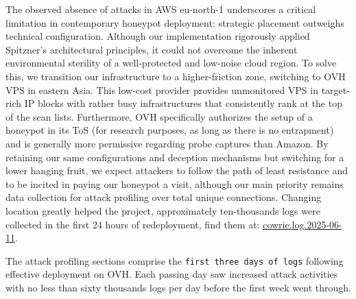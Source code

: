 \documentclass{cls/ULBreport}
\begin{document}
The observed absence of attacks in AWS eu-north-1 underscores a critical limitation in contemporary honeypot deployment: strategic placement outweighs technical configuration. Although our implementation rigorously applied Spitzner’s architectural principles, it could not overcome the inherent environmental sterility of a well-protected and low-noise cloud region. To solve this, we transition our infrastructure to a higher-friction zone, switching to OVH VPS in eastern Asia. This low-cost provider provides unmonitored VPS in target-rich IP blocks with rather busy infrastructures that consistently rank at the top of the scan lists. Furthermore, OVH specifically authorizes the setup of a honeypot in its ToS (for research purposes, as long as there is no entrapment) and is generally more permissive regarding probe captures than Amazon. By retaining our same configurations and deception mechanisms but switching for a lower hanging fruit, we expect attackers to follow the path of least resistance and to be incited in paying our honeypot a visit, although our main priority remains data collection for attack profiling over total unique connections. Changing location greatly helped the project, approximately ten-thousands logs were collected in the first 24 hours of redeployment, find them at: \href{https://github.com/nottoBD/netsec-honeypot/tree/master/log}{cowrie.log.2025-06-11}. 

The attack profiling sections comprise the \texttt{first three days of logs} following effective deployment on OVH. Each passing day saw increased attack activities with no less than sixty thousands logs per day before the first week went through.
\end{document}
